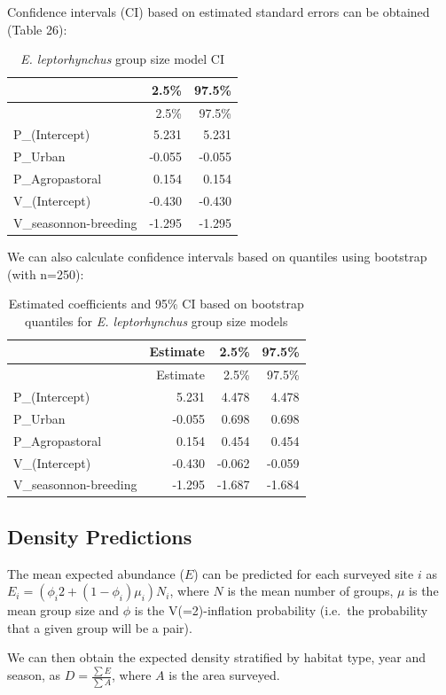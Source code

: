 \documentclass[]{article}
\begin{document}
Confidence intervals (CI) based on estimated standard errors can be
obtained (Table 26):

\begin{longtable}[]{@{}lrr@{}}
\caption{\textit{E. leptorhynchus} group size model CI}\tabularnewline
\toprule
& 2.5\% & 97.5\%\tabularnewline
\midrule
\endfirsthead
\toprule
& 2.5\% & 97.5\%\tabularnewline
\midrule
\endhead
P\_(Intercept) & 5.231 & 5.231\tabularnewline
P\_Urban & -0.055 & -0.055\tabularnewline
P\_Agropastoral & 0.154 & 0.154\tabularnewline
V\_(Intercept) & -0.430 & -0.430\tabularnewline
V\_seasonnon-breeding & -1.295 & -1.295\tabularnewline
\bottomrule
\end{longtable}

We can also calculate confidence intervals based on quantiles using
bootstrap (with n=250):

\begin{longtable}[]{@{}lrrr@{}}
\caption{Estimated coefficients and 95\% CI based on bootstrap quantiles
for \textit{E. leptorhynchus} group size models}\tabularnewline
\toprule
& Estimate & 2.5\% & 97.5\%\tabularnewline
\midrule
\endfirsthead
\toprule
& Estimate & 2.5\% & 97.5\%\tabularnewline
\midrule
\endhead
P\_(Intercept) & 5.231 & 4.478 & 4.478\tabularnewline
P\_Urban & -0.055 & 0.698 & 0.698\tabularnewline
P\_Agropastoral & 0.154 & 0.454 & 0.454\tabularnewline
V\_(Intercept) & -0.430 & -0.062 & -0.059\tabularnewline
V\_seasonnon-breeding & -1.295 & -1.687 & -1.684\tabularnewline
\bottomrule
\end{longtable}

\subsection{Density Predictions}\label{density-predictions-1}

The mean expected abundance (\(E\)) can be predicted for each surveyed
site \(i\) as \(E_{i} = (\phi_{i} 2 + (1 - \phi_{i})\mu_{i})N_{i}\),
where \(N\) is the mean number of groups, \(\mu\) is the mean group size
and \(\phi\) is the V(=2)-inflation probability (i.e.~the probability
that a given group will be a pair).

We can then obtain the expected density stratified by habitat type, year
and season, as \(D = \frac{\sum E}{\sum A}\), where \(A\) is the area
surveyed.
\end{document}
